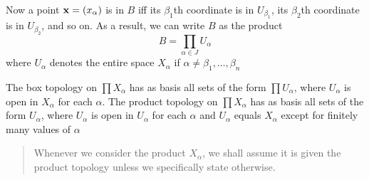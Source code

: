 \documentclass[11pt]{article}
\begin{document}
Now a point \(\operatorname{\textbf{x}}=(x_\alpha)\) is in \(B\) iff its \(\beta_1\)th coordinate is in \(U_{\beta_1}\),  its \(\beta_2\)th
coordinate is in \(U_{\beta_2}\), and so on. As a result, we can write \(B\) as the product
\begin{equation*}
B=\prod_{\alpha\in J}U_\alpha
\end{equation*}
where \(U_\alpha\) denotes the entire space \(X_\alpha\) if \(\alpha\neq\beta_1,\dots,\beta_n\)

\begin{theorem}
The box topology on \(\prod X_\alpha\) has as basis all sets of the form \(\prod U_\alpha\), where \(U_\alpha\) is open
in \(X_\alpha\) for each \(\alpha\). The product topology on \(\prod X_\alpha\) has as basis all sets of the
form \(U_\alpha\), where \(U_\alpha\) is open in \(U_\alpha\) for  each \(\alpha\) and \(U_\alpha\) equals \(X_\alpha\) except
for finitely many values of \(\alpha\)
\end{theorem}

\begin{quote}
Whenever we consider the product \(X_\alpha\), we shall assume it is given the product topology unless we specifically state otherwise.
\end{quote}
\end{document}
